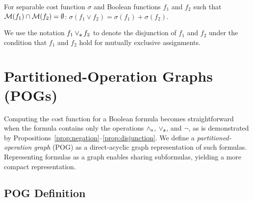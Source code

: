 \documentclass{llncs}
\newcommand{\pand}{\mathbin{\land_{\sf v}}}
\newcommand{\por}{\mathbin{\lor_{\sf a}}}
\newcommand{\tautology}{1}
\newcommand{\nil}{0}
\newcommand{\pite}{\mbox{\it ITE}_{\sf v}}
\newcommand{\interpset}[1]{{\cal M}(#1)}
\newcommand{\cost}{\sigma}
\newcommand{\depend}{{\it D}}
\begin{document}
\begin{proposition}
\label{prop:disjunction}
  For separable cost function $\cost$ and Boolean functions $f_1$ and $f_2$ such that $\interpset{f_1} \cap \interpset{f_2} = \emptyset$:
    $\cost(f_1 \lor f_2) = \cost(f_1) + \cost(f_2)$.
\end{proposition}
We use the notation $f_1 \por f_2$ to denote the disjunction of $f_1$ and $f_2$ under the
condition that $f_1$ and $f_2$ hold for mutually exclusive assignments.





\section{Partitioned-Operation Graphs (POGs)}

Computing the cost function for a Boolean formula becomes
straightforward when the formula contains only the operations
$\pand$, $\por$, and $\neg$, as is demonstrated by
Propositions~\ref{prop:negation}--\ref{prop:disjunction}.  We define a {\em partitioned-operation graph} (POG)
as a direct-acyclic graph representation of such formulas.
Representing formulas as a graph enables sharing subformulas, yielding a more compact representation.

\subsection{POG Definition}
\end{document}
